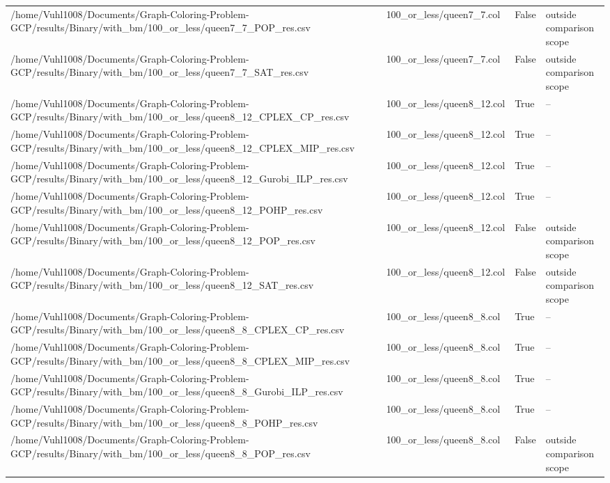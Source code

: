 \begin{table}[htbp]
\begin{tabular}{llll}
/home/Vuhl1008/Documents/Graph-Coloring-Problem-GCP/results/Binary/with\_bm/100\_or\_less/queen7\_7\_POP\_res.csv & 100\_or\_less/queen7\_7.col & False & outside comparison scope \\
/home/Vuhl1008/Documents/Graph-Coloring-Problem-GCP/results/Binary/with\_bm/100\_or\_less/queen7\_7\_SAT\_res.csv & 100\_or\_less/queen7\_7.col & False & outside comparison scope \\
/home/Vuhl1008/Documents/Graph-Coloring-Problem-GCP/results/Binary/with\_bm/100\_or\_less/queen8\_12\_CPLEX\_CP\_res.csv & 100\_or\_less/queen8\_12.col & True & -- \\
/home/Vuhl1008/Documents/Graph-Coloring-Problem-GCP/results/Binary/with\_bm/100\_or\_less/queen8\_12\_CPLEX\_MIP\_res.csv & 100\_or\_less/queen8\_12.col & True & -- \\
/home/Vuhl1008/Documents/Graph-Coloring-Problem-GCP/results/Binary/with\_bm/100\_or\_less/queen8\_12\_Gurobi\_ILP\_res.csv & 100\_or\_less/queen8\_12.col & True & -- \\
/home/Vuhl1008/Documents/Graph-Coloring-Problem-GCP/results/Binary/with\_bm/100\_or\_less/queen8\_12\_POHP\_res.csv & 100\_or\_less/queen8\_12.col & True & -- \\
/home/Vuhl1008/Documents/Graph-Coloring-Problem-GCP/results/Binary/with\_bm/100\_or\_less/queen8\_12\_POP\_res.csv & 100\_or\_less/queen8\_12.col & False & outside comparison scope \\
/home/Vuhl1008/Documents/Graph-Coloring-Problem-GCP/results/Binary/with\_bm/100\_or\_less/queen8\_12\_SAT\_res.csv & 100\_or\_less/queen8\_12.col & False & outside comparison scope \\
/home/Vuhl1008/Documents/Graph-Coloring-Problem-GCP/results/Binary/with\_bm/100\_or\_less/queen8\_8\_CPLEX\_CP\_res.csv & 100\_or\_less/queen8\_8.col & True & -- \\
/home/Vuhl1008/Documents/Graph-Coloring-Problem-GCP/results/Binary/with\_bm/100\_or\_less/queen8\_8\_CPLEX\_MIP\_res.csv & 100\_or\_less/queen8\_8.col & True & -- \\
/home/Vuhl1008/Documents/Graph-Coloring-Problem-GCP/results/Binary/with\_bm/100\_or\_less/queen8\_8\_Gurobi\_ILP\_res.csv & 100\_or\_less/queen8\_8.col & True & -- \\
/home/Vuhl1008/Documents/Graph-Coloring-Problem-GCP/results/Binary/with\_bm/100\_or\_less/queen8\_8\_POHP\_res.csv & 100\_or\_less/queen8\_8.col & True & -- \\
/home/Vuhl1008/Documents/Graph-Coloring-Problem-GCP/results/Binary/with\_bm/100\_or\_less/queen8\_8\_POP\_res.csv & 100\_or\_less/queen8\_8.col & False & outside comparison scope \\

\end{tabular}
\end{table}
